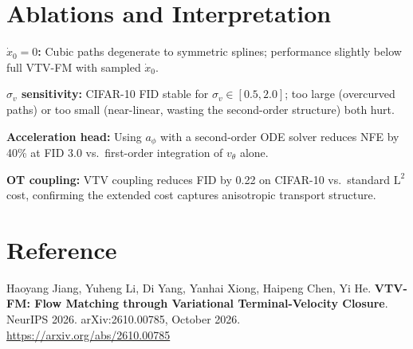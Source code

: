 \documentclass[10pt,twocolumn]{article}
\begin{document}
\section{Ablations and Interpretation}

\textbf{$\dot{x}_0{=}0$:} Cubic paths degenerate to symmetric splines;
performance slightly below full VTV-FM with sampled $\dot{x}_0$.

\textbf{$\sigma_v$ sensitivity:} CIFAR-10 FID stable for $\sigma_v \in [0.5,2.0]$;
too large (overcurved paths) or too small (near-linear, wasting the second-order
structure) both hurt.

\textbf{Acceleration head:} Using $a_\phi$ with a second-order ODE solver
reduces NFE by 40\% at FID 3.0 vs.\ first-order integration of $v_\theta$ alone.

\textbf{OT coupling:} VTV coupling reduces FID by 0.22 on CIFAR-10 vs.\
standard $\mathrm{L}^2$ cost, confirming the extended cost captures
anisotropic transport structure.

\section*{Reference}

Haoyang Jiang, Yuheng Li, Di Yang, Yanhai Xiong, Haipeng Chen, Yi He.
\textbf{VTV-FM: Flow Matching through Variational Terminal-Velocity Closure}.
NeurIPS 2026. arXiv:2610.00785, October 2026.\\
\url{https://arxiv.org/abs/2610.00785}
\end{document}
